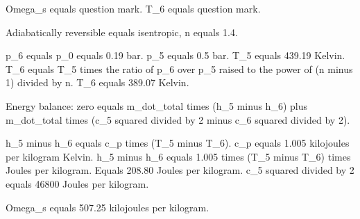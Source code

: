 Omega_s equals question mark.
T_6 equals question mark.

Adiabatically reversible equals isentropic, n equals 1.4.

p_6 equals p_0 equals 0.19 bar.
p_5 equals 0.5 bar.
T_5 equals 439.19 Kelvin.
T_6 equals T_5 times the ratio of p_6 over p_5 raised to the power of (n minus 1) divided by n.
T_6 equals 389.07 Kelvin.

Energy balance: zero equals m_dot_total times (h_5 minus h_6) plus m_dot_total times (c_5 squared divided by 2 minus c_6 squared divided by 2).

h_5 minus h_6 equals c_p times (T_5 minus T_6).
c_p equals 1.005 kilojoules per kilogram Kelvin.
h_5 minus h_6 equals 1.005 times (T_5 minus T_6) times Joules per kilogram.
Equals 208.80 Joules per kilogram.
c_5 squared divided by 2 equals 46800 Joules per kilogram.

Omega_s equals 507.25 kilojoules per kilogram.